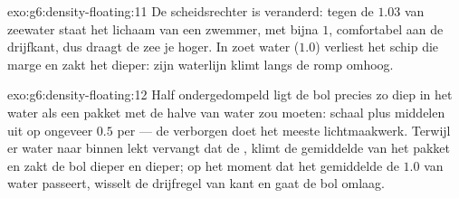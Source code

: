 \begin{solution}{exo:g6:density-floating:11}
De scheidsrechter is veranderd: tegen de $1.03$ van zeewater staat het
lichaam van een zwemmer, met bijna $1$, comfortabel aan de drijfkant,
dus draagt de zee je hoger. In zoet water ($1.0$) verliest het schip
die marge en zakt het dieper: zijn waterlijn klimt langs de romp
omhoog.
\end{solution}

\begin{solution}{exo:g6:density-floating:12}
Half ondergedompeld ligt de bol precies zo diep in het water als een
pakket met de halve  van water zou moeten: schaal plus
 middelen uit op ongeveer $0.5$  per
 --- de verborgen  doet het meeste
lichtmaakwerk. Terwijl er water naar binnen lekt vervangt dat de
, klimt de gemiddelde  van het pakket en zakt de bol
dieper en dieper; op het moment dat het gemiddelde de $1.0$ van water
passeert, wisselt de drijfregel van kant en gaat de bol omlaag.
\end{solution}

